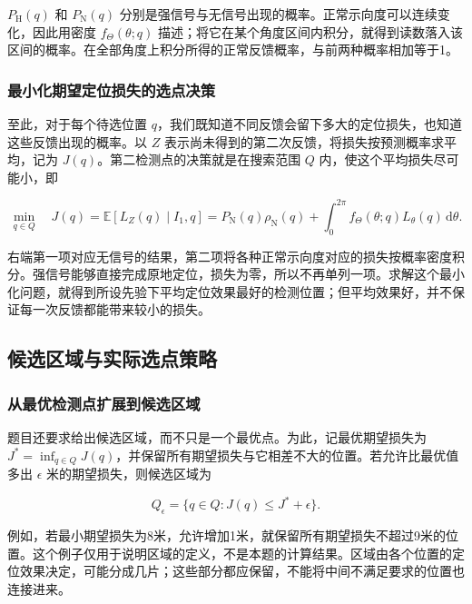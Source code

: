 \(P_{\mathrm H}(q)\) 和 \(P_{\mathrm N}(q)\) 分别是强信号与无信号出现的概率。正常示向度可以连续变化，因此用密度 \(f_\Theta(\theta;q)\) 描述；将它在某个角度区间内积分，就得到读数落入该区间的概率。在全部角度上积分所得的正常反馈概率，与前两种概率相加等于1。

\subsubsection{最小化期望定位损失的选点决策}

至此，对于每个待选位置 \(q\)，我们既知道不同反馈会留下多大的定位损失，也知道这些反馈出现的概率。以 \(Z\) 表示尚未得到的第二次反馈，将损失按预测概率求平均，记为 \(J(q)\)。第二检测点的决策就是在搜索范围 \(Q\) 内，使这个平均损失尽可能小，即

\begin{equation}
 \min_{q\in Q}\quad J(q)=\mathbb E[L_Z(q)\mid I_1,q]
 =P_{\mathrm N}(q)\rho_{\mathrm N}(q)
 +\int_0^{2\pi}f_\Theta(\theta;q)L_\theta(q)\,\mathrm d\theta.
\label{eq:q2-pair-expected-objective}
\end{equation}

右端第一项对应无信号的结果，第二项将各种正常示向度对应的损失按概率密度积分。强信号能够直接完成原地定位，损失为零，所以不再单列一项。求解这个最小化问题，就得到所设先验下平均定位效果最好的检测位置；但平均效果好，并不保证每一次反馈都能带来较小的损失。

\subsection{候选区域与实际选点策略}

\subsubsection{从最优检测点扩展到候选区域}

题目还要求给出候选区域，而不只是一个最优点。为此，记最优期望损失为 \(J^*=\inf_{q\in Q}J(q)\)，并保留所有期望损失与它相差不大的位置。若允许比最优值多出 \(\epsilon\) 米的期望损失，则候选区域为

\begin{equation}
 Q_\epsilon=\{q\in Q:J(q)\le J^*+\epsilon\}.
 \label{eq:q2-candidate-region}
\end{equation}

例如，若最小期望损失为8米，允许增加1米，就保留所有期望损失不超过9米的位置。这个例子仅用于说明区域的定义，不是本题的计算结果。区域由各个位置的定位效果决定，可能分成几片；这些部分都应保留，不能将中间不满足要求的位置也连接进来。

